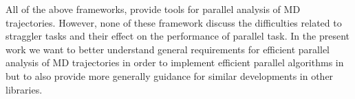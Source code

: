 All of the above frameworks, provide tools for parallel analysis of MD trajectories. 
However, none of these framework discuss the difficulties related to straggler tasks and their effect on the performance of parallel task.
In the present work we want to better understand general requirements for efficient parallel analysis of MD trajectories in order to implement efficient parallel algorithms in  but to also provide more generally guidance for similar developments in other libraries.




